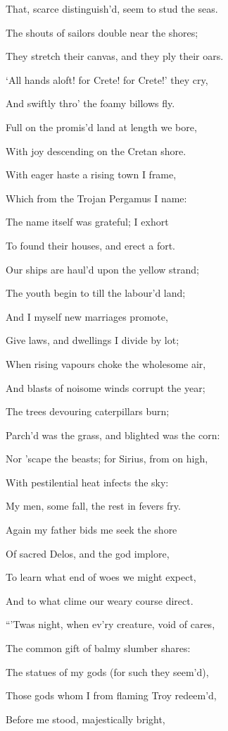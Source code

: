 That, scarce distinguish’d, seem to stud the seas.

The shouts of sailors double near the shores;

They stretch their canvas, and they ply their oars.

‘All hands aloft! for Crete! for Crete!’ they cry,

And swiftly thro’ the foamy billows fly.

Full on the promis’d land at length we bore,

With joy descending on the Cretan shore.

With eager haste a rising town I frame,

Which from the Trojan Pergamus I name:

The name itself was grateful; I exhort

To found their houses, and erect a fort.

Our ships are haul’d upon the yellow strand;

The youth begin to till the labour’d land;

And I myself new marriages promote,

Give laws, and dwellings I divide by lot;

When rising vapours choke the wholesome air,

And blasts of noisome winds corrupt the year;

The trees devouring caterpillars burn;

Parch’d was the grass, and blighted was the corn:

Nor ’scape the beasts; for Sirius, from on high,

With pestilential heat infects the sky:

My men, some fall, the rest in fevers fry.

Again my father bids me seek the shore

Of sacred Delos, and the god implore,

To learn what end of woes we might expect,

And to what clime our weary course direct.

“’Twas night, when ev’ry creature, void of cares,

The common gift of balmy slumber shares:

The statues of my gods (for such they seem’d),

Those gods whom I from flaming Troy redeem’d,

Before me stood, majestically bright,

